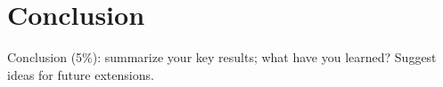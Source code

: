 \section{Conclusion}
Conclusion (5\%): summarize your key results; what have you learned? Suggest ideas for future extensions.
